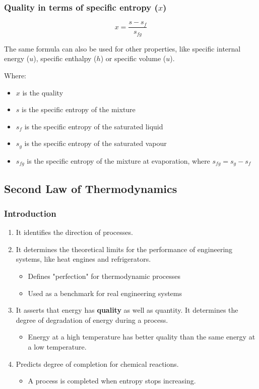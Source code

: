 \documentclass[11pt]{article}
\begin{document}
 \newpage

\subsubsection{Quality in terms of specific entropy (\(x\))}
\label{sec:orgb144a7c}
\[x = \frac{s - s_f}{s_{fg}}\]

The same formula can also be used for other properties, like specific internal energy (\(u\)), specific enthalpy (\(h\)) or specific volume (\(u\)).

Where:
\begin{itemize}
\item \(x\) is the quality
\item \(s\) is the specific entropy of the mixture
\item \(s_f\) is the specific entropy of the saturated liquid
\item \(s_g\) is the specific entropy of the saturated vapour
\item \(s_{fg}\) is the specific entropy of the mixture at evaporation, where \(s_{fg} = s_g - s_f\)
\end{itemize}

\subsection{Second Law of Thermodynamics}
\label{sec:orgea7f7ba}

\subsubsection{Introduction}
\label{sec:org896380f}
\begin{enumerate}
\item It identifies the direction of processes.
\item It determines the theoretical limits for the performance of engineering systems, like heat engines and refrigerators.
\begin{itemize}
\item Defines "perfection" for thermodynamic processes
\item Used as a benchmark for real engineering systems
\end{itemize}
\item It asserts that energy has \textbf{quality} as well as quantity. It determines the degree of degradation of energy during a process.
\begin{itemize}
\item Energy at a high temperature has better quality than the same energy at a low temperature.
\end{itemize}
\item Predicts degree of completion for chemical reactions.
\begin{itemize}
\item A process is completed when entropy stops increasing.
\end{itemize}
\end{enumerate}
\end{document}
